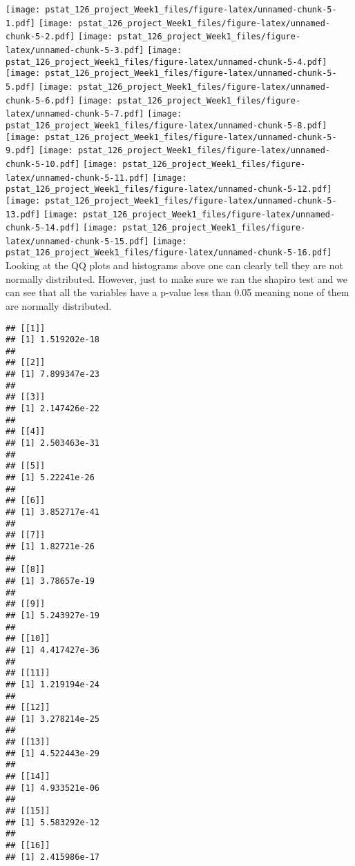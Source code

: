 \documentclass[
]{article}
\newenvironment{Shaded}{\begin{snugshade}}{\end{snugshade}}
\newcommand{\ControlFlowTok}[1]{\textcolor[rgb]{0.13,0.29,0.53}{\textbf{#1}}}
\newcommand{\DecValTok}[1]{\textcolor[rgb]{0.00,0.00,0.81}{#1}}
\newcommand{\FunctionTok}[1]{\textcolor[rgb]{0.00,0.00,0.00}{#1}}
\newcommand{\NormalTok}[1]{#1}
\newcommand{\OtherTok}[1]{\textcolor[rgb]{0.56,0.35,0.01}{#1}}
\newcommand{\SpecialCharTok}[1]{\textcolor[rgb]{0.00,0.00,0.00}{#1}}
\begin{document}
\texttt{[image: pstat\_126\_project\_Week1\_files/figure-latex/unnamed-chunk-5-1.pdf]}
\texttt{[image: pstat\_126\_project\_Week1\_files/figure-latex/unnamed-chunk-5-2.pdf]}
\texttt{[image: pstat\_126\_project\_Week1\_files/figure-latex/unnamed-chunk-5-3.pdf]}
\texttt{[image: pstat\_126\_project\_Week1\_files/figure-latex/unnamed-chunk-5-4.pdf]}
\texttt{[image: pstat\_126\_project\_Week1\_files/figure-latex/unnamed-chunk-5-5.pdf]}
\texttt{[image: pstat\_126\_project\_Week1\_files/figure-latex/unnamed-chunk-5-6.pdf]}
\texttt{[image: pstat\_126\_project\_Week1\_files/figure-latex/unnamed-chunk-5-7.pdf]}
\texttt{[image: pstat\_126\_project\_Week1\_files/figure-latex/unnamed-chunk-5-8.pdf]}
\texttt{[image: pstat\_126\_project\_Week1\_files/figure-latex/unnamed-chunk-5-9.pdf]}
\texttt{[image: pstat\_126\_project\_Week1\_files/figure-latex/unnamed-chunk-5-10.pdf]}
\texttt{[image: pstat\_126\_project\_Week1\_files/figure-latex/unnamed-chunk-5-11.pdf]}
\texttt{[image: pstat\_126\_project\_Week1\_files/figure-latex/unnamed-chunk-5-12.pdf]}
\texttt{[image: pstat\_126\_project\_Week1\_files/figure-latex/unnamed-chunk-5-13.pdf]}
\texttt{[image: pstat\_126\_project\_Week1\_files/figure-latex/unnamed-chunk-5-14.pdf]}
\texttt{[image: pstat\_126\_project\_Week1\_files/figure-latex/unnamed-chunk-5-15.pdf]}
\texttt{[image: pstat\_126\_project\_Week1\_files/figure-latex/unnamed-chunk-5-16.pdf]}
Looking at the QQ plots and histograms above one can clearly tell they
are not normally distributed. However, just to make sure we ran the
shapiro test and we can see that all the variables have a p-value less
than 0.05 meaning none of them are normally distributed.

\begin{Shaded}
\end{Shaded}

\begin{verbatim}
## [[1]]
## [1] 1.519202e-18
## 
## [[2]]
## [1] 7.899347e-23
## 
## [[3]]
## [1] 2.147426e-22
## 
## [[4]]
## [1] 2.503463e-31
## 
## [[5]]
## [1] 5.22241e-26
## 
## [[6]]
## [1] 3.852717e-41
## 
## [[7]]
## [1] 1.82721e-26
## 
## [[8]]
## [1] 3.78657e-19
## 
## [[9]]
## [1] 5.243927e-19
## 
## [[10]]
## [1] 4.417427e-36
## 
## [[11]]
## [1] 1.219194e-24
## 
## [[12]]
## [1] 3.278214e-25
## 
## [[13]]
## [1] 4.522443e-29
## 
## [[14]]
## [1] 4.933521e-06
## 
## [[15]]
## [1] 5.583292e-12
## 
## [[16]]
## [1] 2.415986e-17
\end{verbatim}
\end{document}
